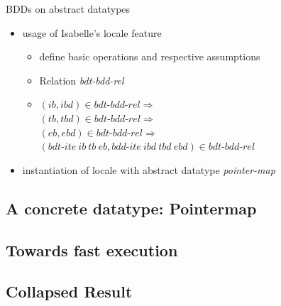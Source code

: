 \documentclass[%
	sans,
	12pt,
]{beamer}
\begin{document}
\begin{frame}{BDDs on abstract datatypes}
\begin{itemize}
  \item usage of Isabelle's locale feature
    \begin{itemize}
      \item define basic operations and respective assumptions
      \item Relation \textit{bdt-bdd-rel}
      \item $ (ib, ibd) \in \textit{bdt-bdd-rel}  \Longrightarrow $ \\
             $(tb, tbd) \in \textit{bdt-bdd-rel} \Longrightarrow $ \\
             $(eb, ebd) \in \textit{bdt-bdd-rel} \Longrightarrow $ \\
             $(\textit{bdt-ite}\ ib\ tb\ eb, \textit{bdd-ite}\ ibd\ tbd\ ebd) 
             \in \textit{bdt-bdd-rel} $
    \end{itemize}
  \item instantiation of locale with abstract datatype \textit{pointer-map}
\end{itemize}

\end{frame}

\subsection{A concrete datatype: Pointermap}
\subsection{Towards fast execution}
\subsection{Collapsed Result}
\begin{frame}
\end{frame}
\end{document}
